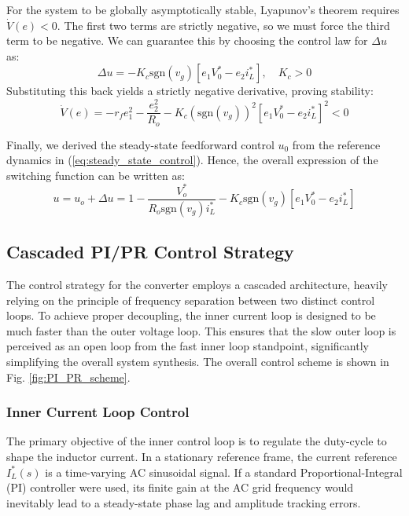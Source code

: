 \documentclass[DIV=calc, paper=a4, fontsize=11pt, twocolumn]{scrartcl}	 %
\begin{document}
For the system to be globally asymptotically stable, Lyapunov's theorem requires $\dot{V}(e) < 0$. The first two terms are strictly negative, so we must force the third term to be negative. We can guarantee this by choosing the control law for $\Delta u$ as:
\begin{equation}\label{eq:LY_control}
    \Delta u = -K_c \text{sgn}(v_g) \left[ e_1 V_0^* - e_2 i_L^* \right], \quad K_c > 0
\end{equation}
Substituting this back yields a strictly negative derivative, proving stability:
\begin{equation}\label{eq:der_LY}
    \dot{V}(e) = -r_f e_1^2 - \frac{e_2^2}{R_o} - K_c \left( \text{sgn}(v_g) \right)^2 \left[  e_1 V_0^* - e_2 i_L^* \right]^2 < 0
\end{equation}

Finally, we derived the steady-state feedforward control $u_0$ from the reference dynamics in (\ref{eq:steady_state_control}). Hence, the overall expression of the switching function
can be written as:
{\small
\begin{equation}
    u = u_o + \Delta{u} = 1 - \frac{V^*_o}{R_o \text{sgn}(v_g)i^*_L}  - K_c \text{sgn}(v_g) \left[ e_1 V_0^* - e_2 i_L^* \right]
\end{equation}
}


\subsection{Cascaded PI/PR Control Strategy}

The control strategy for the converter employs a cascaded architecture, heavily relying on the principle of frequency separation between two distinct control loops. To achieve proper decoupling, the inner current loop is designed to be much faster than the outer voltage loop. This ensures that the slow outer loop is perceived as an open loop from the fast inner loop standpoint, significantly simplifying the overall system synthesis. The overall control scheme is shown in Fig. \ref{fig:PI_PR_scheme}.

\subsubsection{Inner Current Loop Control}

The primary objective of the inner control loop is to regulate the duty-cycle to shape the inductor current. In a stationary reference frame, the current reference $I_L^*(s)$ is a time-varying AC sinusoidal signal. If a standard Proportional-Integral (PI) controller were used, its finite gain at the AC grid frequency would inevitably lead to a steady-state phase lag and amplitude tracking errors. 
\end{document}
